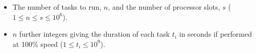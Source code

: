 

\begin{itemize}
  \item The number of tasks to run, $n$, and the number of processor slots, $s$ ($1 \le n \le s \le 10^6$).
  \item $n$ further integers giving the duration of each task $t_i$ in seconds if performed at 100\% speed ($1 \le t_i \le 10^9$).
\end{itemize}

